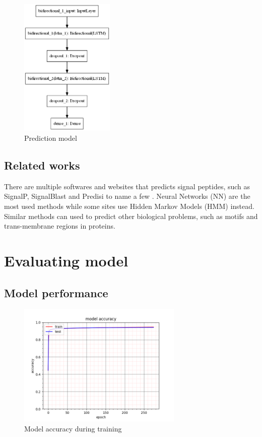 \begin{figure}[H]
\centering
\includegraphics[width=0.4\textwidth]{pictures/model.png}
\caption{\label{fig:model_fig}Prediction model}
\end{figure}


\subsection{Related works}

There are multiple softwares and websites that predicts signal peptides, such as SignalP, SignalBlast and Predisi to name a few \cite{sp_predict1} \cite{sp_predict2} \cite{sp_predict3}. Neural Networks (NN) are the most used methods while some sites use Hidden Markov Models (HMM) instead. Similar methods can used to predict other biological problems, such as motifs and trans-membrane regions in proteins.


\section{Evaluating model}

\subsection{Model performance}

\begin{figure}[H]
\center
\includegraphics[width=0.7\textwidth]{pictures/train_acc.png}
\caption{\label{fig:train_acc}Model accuracy during training}
\end{figure}

